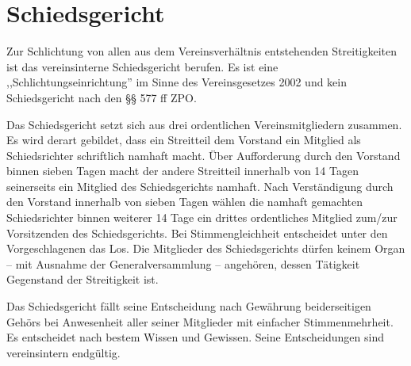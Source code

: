 \documentclass{article}
\begin{document}
\section{Schiedsgericht}\label{schiedsgericht}
\begin{absatz}
    \item Zur Schlichtung von allen aus dem Vereinsverhältnis entstehenden Streitigkeiten ist das vereinsinterne Schiedsgericht berufen. Es ist eine ,,Schlichtungseinrichtung'' im Sinne des Vereinsgesetzes 2002 und kein Schiedsgericht nach den §§ 577 ff ZPO.
    \item Das Schiedsgericht setzt sich aus drei ordentlichen Vereinsmitgliedern zusammen. Es wird derart gebildet, dass ein Streitteil dem Vorstand ein Mitglied als Schiedsrichter schriftlich namhaft macht. Über Aufforderung durch den Vorstand binnen sieben Tagen macht der andere Streitteil innerhalb von 14 Tagen seinerseits ein Mitglied des Schiedsgerichts namhaft. Nach Verständigung durch den Vorstand innerhalb von sieben Tagen wählen die namhaft gemachten Schiedsrichter binnen weiterer 14 Tage ein drittes ordentliches Mitglied zum/zur Vorsitzenden des Schiedsgerichts. Bei Stimmengleichheit entscheidet unter den Vorgeschlagenen das Los. Die Mitglieder des Schiedsgerichts dürfen keinem Organ – mit Ausnahme der Generalversammlung – angehören, dessen Tätigkeit Gegenstand der Streitigkeit ist.
    \item Das Schiedsgericht fällt seine Entscheidung nach Gewährung beiderseitigen Gehörs bei Anwesenheit aller seiner Mitglieder mit einfacher Stimmenmehrheit. Es entscheidet nach bestem Wissen und Gewissen. Seine Entscheidungen sind vereinsintern endgültig.
\end{absatz}
\end{document}
